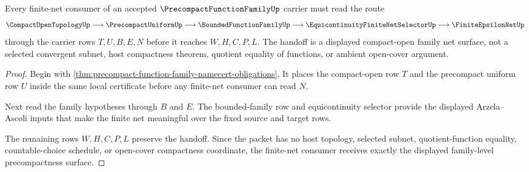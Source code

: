 \begin{theorem}
\label{thm:precompact-function-family-finite-net-handoff}
Every finite-net consumer of an accepted $\PrecompactFunctionFamilyUp$ carrier must read the route
$$
\CompactOpenTopologyUp \longrightarrow \PrecompactUniformUp \longrightarrow \BoundedFunctionFamilyUp \longrightarrow \EquicontinuityFiniteNetSelectorUp \longrightarrow \FiniteEpsilonNetUp
$$
through the carrier rows $T,U,B,E,N$ before it reaches $W,H,C,P,L$. The handoff is a displayed compact-open family net surface, not a selected convergent subnet, host compactness theorem, quotient equality of functions, or ambient open-cover argument.
\end{theorem}
\begin{proof}
Begin with \autoref{thm:precompact-function-family-namecert-obligations}. It places the compact-open row $T$ and the precompact uniform row $U$ inside the same local certificate before any finite-net consumer can read $N$.

Next read the family hypotheses through $B$ and $E$. The bounded-family row and equicontinuity selector provide the displayed Arzela--Ascoli inputs that make the finite net meaningful over the fixed source and target rows.

The remaining rows $W,H,C,P,L$ preserve the handoff. Since the packet has no host topology, selected subnet, quotient-function equality, countable-choice schedule, or open-cover compactness coordinate, the finite-net consumer receives exactly the displayed family-level precompactness surface.
\end{proof}


\begin{closurestatus}{\PrecompactFunctionFamilyUp}
  \theoryclosure{\seedClosure}
  \formalstatus{\unformalizedV}
\end{closurestatus}
